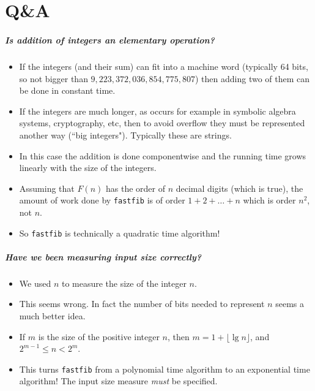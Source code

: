 \chapter{Q\&A} %

\paragraph{Is addition of integers an elementary operation?}
\begin{itemize}
\item If the integers (and their sum) can fit into a machine word (typically 64 bits, so not bigger than $9,223,372,036,854,775,807$) then 
adding two of them can be done in constant time.
\item If the integers are much longer, as occurs for example in symbolic algebra systems, cryptography, etc, then to avoid overflow they must be represented another way (``big integers"). Typically these are strings.
\item In this case the addition is done componentwise and the running time grows linearly with the size of the integers.
\item Assuming that $F(n)$ has the order of $n$ decimal digits (which is true), the amount of work 
done by \texttt{fastfib} is of order $1+2+\dots + n$ which is order $n^2$, not $n$. 
\item So \texttt{fastfib} is technically a quadratic time algorithm!
\end{itemize}



\paragraph{Have we been measuring input size correctly?}
\begin{itemize}
\item We used $n$ to measure the size of the integer $n$. 
\item This seems wrong. In fact the number of bits needed to represent $n$ seems a much better 
idea.
\item If $m$ is the size of the positive integer $n$, then $m = 1+\lfloor\lg n\rfloor$, and $2^{m-1} \leq n < 2^m$.
\item This turns \texttt{fastfib} from a polynomial time algorithm to an exponential time algorithm! The input size measure \emph{must} be specified.
\end{itemize}



